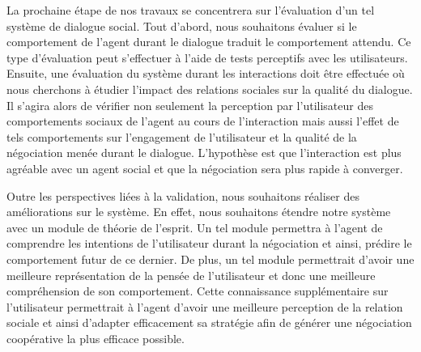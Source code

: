\documentclass [french]{sig-alternate-05-2015}
\begin{document}
\par La prochaine étape de nos travaux se concentrera sur l’évaluation d’un tel système de dialogue social. Tout d'abord, nous souhaitons évaluer si le comportement de l'agent durant le dialogue traduit le comportement attendu. Ce type d'évaluation peut s'effectuer à l'aide de tests perceptifs avec les utilisateurs. 
Ensuite, une évaluation du système durant les interactions doit être effectuée où nous cherchons à étudier l'impact des relations sociales sur la qualité du dialogue. Il s’agira alors de vérifier non seulement la perception par l’utilisateur des comportements sociaux de l’agent au cours de l'interaction mais aussi l’effet de tels comportements sur l’engagement de l’utilisateur et la qualité de la négociation menée durant le dialogue. L'hypothèse est que l'interaction est plus agréable avec un agent social et que la négociation sera plus rapide à converger.

\par Outre les perspectives liées à la validation, nous souhaitons réaliser des améliorations sur le système. En effet, nous souhaitons étendre notre système avec un module de théorie de l'esprit. Un tel module permettra à l'agent de comprendre les intentions de l'utilisateur durant la négociation et ainsi, prédire le comportement futur de ce dernier.  De plus, un tel module permettrait d'avoir une meilleure  représentation de la pensée de l'utilisateur et donc une meilleure compréhension de son comportement. Cette connaissance supplémentaire sur l'utilisateur permettrait à l'agent d'avoir une meilleure perception de la relation sociale et ainsi d'adapter efficacement sa stratégie afin de générer une négociation coopérative la plus efficace possible.
\vskip 4pt


\end{document}
